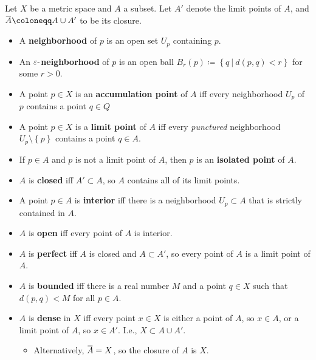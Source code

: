 \begin{definition}

Let \(X\) be a metric space and \(A\) a subset. Let \(A'\) denote the
limit points of \(A\), and
\(\mkern 1.5mu\overline{\mkern-1.5muA\mkern-1.5mu}\mkern 1.5mu \coloneqq A\cup A'\)
to be its closure.

\begin{itemize}
\item
  A \textbf{neighborhood} of \(p\) is an open set \(U_p\) containing
  \(p\).
\item
  An \(\varepsilon{\hbox{-}}\)\textbf{neighborhood} of \(p\) is an open
  ball
  \(B_r(p) \coloneqq\left\{{q {~\mathrel{\Big|}~}d(p, q) < r}\right\}\)
  for some \(r>0\).
\item
  A point \(p\in X\) is an \textbf{accumulation point} of \(A\) iff
  every neighborhood \(U_p\) of \(p\) contains a point \(q\in Q\)
\item
  A point \(p\in X\) is a \textbf{limit point} of \(A\) iff every
  \emph{punctured} neighborhood \(U_p\setminus\left\{{p}\right\}\)
  contains a point \(q\in A\).
\item
  If \(p\in A\) and \(p\) is not a limit point of \(A\), then \(p\) is
  an \textbf{isolated point} of \(A\).
\item
  \(A\) is \textbf{closed} iff \(A' \subset A\), so \(A\) contains all
  of its limit points.
\item
  A point \(p\in A\) is \textbf{interior} iff there is a neighborhood
  \(U_p \subset A\) that is strictly contained in \(A\).
\item
  \(A\) is \textbf{open} iff every point of \(A\) is interior.
\item
  \(A\) is \textbf{perfect} iff \(A\) is closed and \(A\subset A'\), so
  every point of \(A\) is a limit point of \(A\).
\item
  \(A\) is \textbf{bounded} iff there is a real number \(M\) and a point
  \(q\in X\) such that \(d(p, q) < M\) for all \(p\in A\).
\item
  \(A\) is \textbf{dense} in \(X\) iff every point \(x\in X\) is either
  a point of \(A\), so \(x\in A\), or a limit point of \(A\), so
  \(x\in A'\). I.e., \(X\subset A\cup A'\).

  \begin{itemize}
  \tightlist
  \item
    Alternatively,
    \(\mkern 1.5mu\overline{\mkern-1.5muA\mkern-1.5mu}\mkern 1.5mu = X\),
    so the closure of \(A\) is \(X\).
  \end{itemize}
\end{itemize}

\end{definition}

